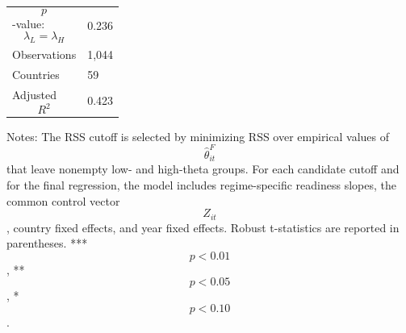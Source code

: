 \begin{table}[H]
\begin{threeparttable}
\begin{tabularx}{\textwidth}{lY}
$$p$$-value: $$\lambda_L=\lambda_H$$ & 0.236 \\
Observations & 1,044 \\
Countries & 59 \\
Adjusted $$R^2$$ & 0.423 \\
\bottomrule
\end{tabularx}
\begin{tablenotes}[flushleft]\footnotesize
\item Notes: The RSS cutoff is selected by minimizing RSS over empirical values of $$\widehat{\theta}^{F}_{it}$$ that leave nonempty low- and high-theta groups. For each candidate cutoff and for the final regression, the model includes regime-specific readiness slopes, the common control vector $$Z_{it}$$, country fixed effects, and year fixed effects. Robust t-statistics are reported in parentheses. *** $$p<0.01$$, ** $$p<0.05$$, * $$p<0.10$$.
\end{tablenotes}
\end{threeparttable}
\end{table}
